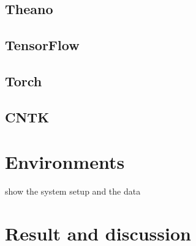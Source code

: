 \subsection{Theano}
\subsection{TensorFlow}
\subsection{Torch}
\subsection{CNTK}
\section{Environments}
show the system setup and the data
\section{Result and discussion}